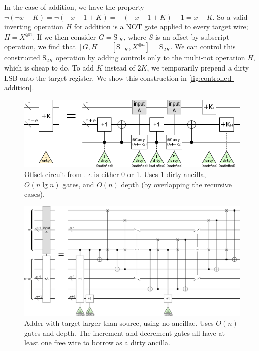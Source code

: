 \documentclass[twocolumn,longbibliography]{quantumarticle-customized}
\begin{document}
In the case of addition, we have the property $\lnot (\lnot x + K) = \lnot (-x - 1 + K) = -(-x - 1 + K) - 1 = x-K$.
So a valid inverting operation $H$ for addition is a NOT gate applied to every target wire; $H=X^{\otimes n}$.
If we then consider $G=\text{S}_{\text{-} K}$, where $S$ is an offset-by-subscript operation, we find that $[G, H] = [\text{S}_{-K}, X^{\otimes n}] = \text{S}_{2K}$.
We can control this constructed $\text{S}_{2K}$ operation by adding controls only to the multi-not operation $H$, which is cheap to do.
To add $K$ instead of $2K$, we temporarily prepend a dirty LSB onto the target register.
We show this construction in \autoref{fig:controlled-addition}.

\begin{figure}
  \centering
  \includegraphics[width=\linewidth]{assets/offset.png}
  \caption{
      Offset circuit from \cite{haner2016}.
      $e$ is either 0 or 1.
      Uses $1$ dirty ancilla, $O(n \lg n)$ gates, and $O(n)$ depth (by overlapping the recursive cases).
  }
  \label{fig:offset}
\end{figure}

\begin{figure}
  \centering
  \includegraphics[width=\linewidth]{assets/inline-adder-into-large.png}
  \caption{
      Adder with target larger than source, using no ancillae.
      Uses $O(n)$ gates and depth.
      The increment and decrement gates all have at least one free wire to borrow as a dirty ancilla.
  }
  \label{fig:inline-adder-into-large}
\end{figure}
\end{document}
